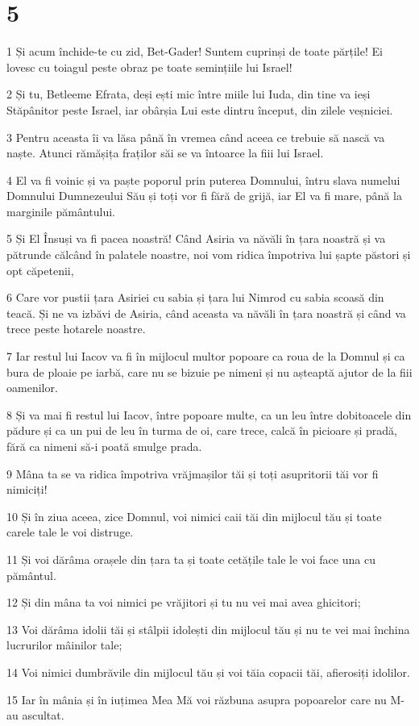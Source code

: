 \chapter{5}

\par 1 Și acum închide-te cu zid, Bet-Gader! Suntem cuprinși de toate părțile! Ei lovesc cu toiagul peste obraz pe toate semințiile lui Israel!
\par 2 Și tu, Betleeme Efrata, deși ești mic între miile lui Iuda, din tine va ieși Stăpânitor peste Israel, iar obârșia Lui este dintru început, din zilele veșniciei.
\par 3 Pentru aceasta îi va lăsa până în vremea când aceea ce trebuie să nască va naște. Atunci rămășița fraților săi se va întoarce la fiii lui Israel.
\par 4 El va fi voinic și va paște poporul prin puterea Domnului, întru slava numelui Domnului Dumnezeului Său și toți vor fi fără de grijă, iar El va fi mare, până la marginile pământului.
\par 5 Și El Însuși va fi pacea noastră! Când Asiria va năvăli în țara noastră și va pătrunde călcând în palatele noastre, noi vom ridica împotriva lui șapte păstori și opt căpetenii,
\par 6 Care vor pustii țara Asiriei cu sabia și țara lui Nimrod cu sabia scoasă din teacă. Și ne va izbăvi de Asiria, când aceasta va năvăli în țara noastră și când va trece peste hotarele noastre.
\par 7 Iar restul lui Iacov va fi în mijlocul multor popoare ca roua de la Domnul și ca bura de ploaie pe iarbă, care nu se bizuie pe nimeni și nu așteaptă ajutor de la fiii oamenilor.
\par 8 Și va mai fi restul lui Iacov, între popoare multe, ca un leu între dobitoacele din pădure și ca un pui de leu în turma de oi, care trece, calcă în picioare și pradă, fără ca nimeni să-i poată smulge prada.
\par 9 Mâna ta se va ridica împotriva vrăjmașilor tăi și toți asupritorii tăi vor fi nimiciți!
\par 10 Și în ziua aceea, zice Domnul, voi nimici caii tăi din mijlocul tău și toate carele tale le voi distruge.
\par 11 Și voi dărâma orașele din țara ta și toate cetățile tale le voi face una cu pământul.
\par 12 Și din mâna ta voi nimici pe vrăjitori și tu nu vei mai avea ghicitori;
\par 13 Voi dărâma idolii tăi și stâlpii idolești din mijlocul tău și nu te vei mai închina lucrurilor mâinilor tale;
\par 14 Voi nimici dumbrăvile din mijlocul tău și voi tăia copacii tăi, afierosiți idolilor.
\par 15 Iar în mânia și în iuțimea Mea Mă voi răzbuna asupra popoarelor care nu M-au ascultat.

